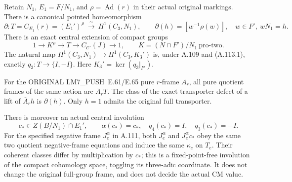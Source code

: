Retain \(N_1\), \(E_1=F/N_1\), and
\(\rho=\operatorname{Ad}(r)\) in their actual original markings.
There is a canonical pointed homeomorphism
\[
 \partial:T=C_{E_1}(r)=(E_1')^\rho
       \ \xrightarrow{\ \sim\ }\ H^1(C_3,N_1),\qquad
 \partial(h)=[w^{-1}\rho(w)],\quad w\in F',\ wN_1=h.
 \tag{A.113.1}
\]
There is an exact central extension of compact groups
\[
 1\longrightarrow K^\rho\longrightarrow T
   \longrightarrow C_{\mathcal C'}(J)\longrightarrow1,\qquad
 K=(N\cap F')/N_1\ \text{pro-two}.
 \tag{A.113.2}
\]
The natural map \(H^1(C_3,N_1)\to H^1(C_3,K_3')\) is,
under A.109 and (A.113.1), exactly \(q_3:T\to\{I,-I\}\).
Here \(K_3'=\ker(q_3|_{F'})\).

For the ORIGINAL LM7\_PUSH~E.61/E.65 pure \(r\)-frame \(A_r\),
all pure quotient frames of the same action are
\(\overline A_rT\). The class of the exact transporter defect of
a lift of \(\overline A_rh\) is \(\partial(h)\).
Only \(h=1\) admits the original full transporter.

There is moreover an actual central involution
\[
 c_*\in Z(B/N_1)\cap E_1',\qquad
 \alpha(c_*)=c_*,\quad q_4(c_*)=I,\quad q_3(c_*)=-I.
 \tag{A.113.3}
\]
For the specified negative frame \(J_e^\alpha\) in A.111,
both \(J_e^\alpha\) and \(J_e^\alpha c_*\) obey the same two
quotient negative-frame equations and induce the same
\(\kappa_e\) on \(T_e\).
Their coherent classes differ by multiplication by \(c_*\);
this is a fixed-point-free involution of the compact cohomology
space, toggling its three-adic coordinate. It does not change the
original full-group frame, and does not decide the actual CM value.

